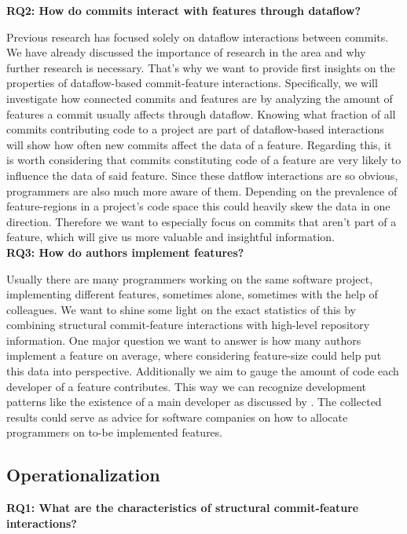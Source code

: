 \textbf{RQ2: How do commits interact with features through dataflow?}

Previous research has focused solely on dataflow interactions between commits.
We have already discussed the importance of research in the area and why further research is necessary.
That's why we want to provide first insights on the properties of dataflow-based commit-feature interactions.
Specifically, we will investigate how connected commits and features are by analyzing the amount of features a commit usually affects through dataflow.
Knowing what fraction of all commits contributing code to a project are part of dataflow-based interactions will show how often new commits affect the data of a feature. 
Regarding this, it is worth considering that commits constituting code of a feature are very likely to influence the data of said feature.
Since these datflow interactions are so obvious, programmers are also much more aware of them. 
Depending on the prevalence of feature-regions in a project's code space this could heavily skew the data in one direction. 
Therefore we want to especially focus on commits that aren't part of a feature, which will give us more valuable and insightful information. \\

\textbf{RQ3: How do authors implement features?}

Usually there are many programmers working on the same software project, implementing different features, sometimes alone, sometimes with the help of colleagues.
We want to shine some light on the exact statistics of this by combining structural commit-feature interactions with high-level repository information.
One major question we want to answer is how many authors implement a feature on average, where considering feature-size could help put this data into perspective.
Additionally we aim to gauge the amount of code each developer of a feature contributes. 
This way we can recognize development patterns like the existence of a main developer as discussed by \citet{sattler2023seal}. 
The collected results could serve as advice for software companies on how to allocate programmers on to-be implemented features. 

\subsection*{Operationalization}\label{sec:operationalization}

\textbf{RQ1: What are the characteristics of structural commit-feature interactions?}

